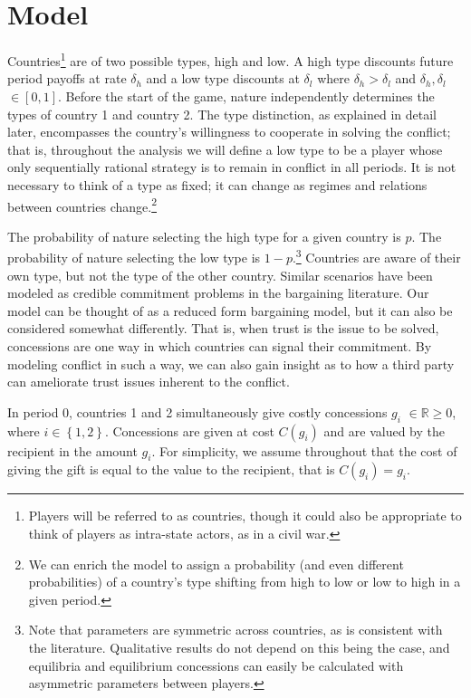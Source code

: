 \documentclass[12pt, letterpaper]{article}
\begin{document}
\section{Model}
\label{sec:model} 

Countries\footnote{Players will be referred to as countries, though it could also be appropriate to think of players as intra-state actors, as in a civil war.} are of two possible types, high and low. A high type discounts future period payoffs at rate $\delta_h$ and a low type discounts at $\delta_l$ where $\delta_h >\delta_l$ and $\delta_h ,\delta_l$ $\in [0,1].$ Before the start of the game, nature independently determines the types of country 1 and country 2. The type distinction, as explained in detail later, encompasses the country's willingness to cooperate in solving the conflict; that is, throughout the analysis we will define a low type to be a player whose only sequentially rational strategy is to remain in conflict in all periods. It is not necessary to think of a type as fixed; it can change as regimes and relations between countries change.\footnote{We can enrich the model to assign a probability (and even different probabilities) of a country's type shifting from high to low or low to high in a given period.}

The probability of nature selecting the high type for a given country is $p$. The probability of nature selecting the low type is $1-p$.\footnote{Note that parameters are symmetric across countries, as is consistent with the literature. Qualitative results do not depend on this being the case, and equilibria and equilibrium concessions can easily be calculated with asymmetric parameters between players.}  Countries are aware of their own type, but not the type of the other country.  Similar scenarios have been modeled as credible commitment problems in the bargaining literature. Our model can be thought of as a reduced form bargaining model, but it can also be considered somewhat differently. That is, when trust is the issue to be solved, concessions are one way in which countries can signal their commitment.  By modeling conflict in such a way, we can also gain insight as to how a third party can ameliorate trust issues inherent to the conflict. 

In period 0, countries 1 and 2 simultaneously give costly concessions $g_i$ $\in \mathbb{R} \geq 0$, where $i\in\left\{1,2\right\}$. Concessions are given at cost $C(g_i)$ and are valued by the recipient in the amount $g_i$. For simplicity, we assume throughout that the cost of giving the gift is equal to the value to the recipient, that is $C(g_i)= g_i$.
\end{document}
